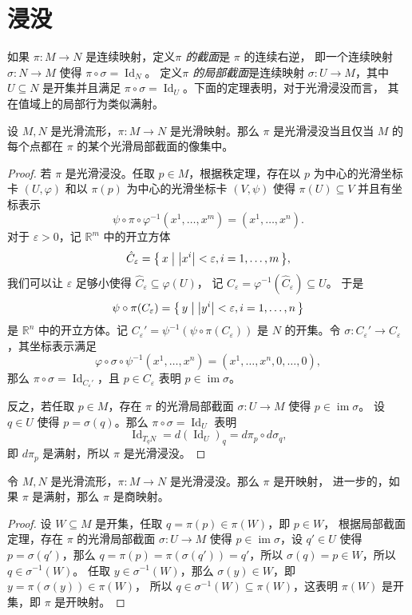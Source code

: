 \documentclass[fontset=none]{Notes}
\DeclareMathOperator\im{im}
\DeclareMathOperator\Id{Id}
\newcommand{\abs}[1]{\left|#1\right|}
\begin{document}
\section{浸没}

如果 $\pi:M\to N$ 是连续映射，定义\emph{$\pi$ 的截面}是 $\pi$ 的连续右逆，
即一个连续映射 $\sigma:N\to M$ 使得 $\pi\circ\sigma=\Id_N$。
定义\emph{$\pi$ 的局部截面}是连续映射 $\sigma:U\to M$，其中 $U\subseteq N$
是开集并且满足 $\pi\circ\sigma=\Id_U$。下面的定理表明，对于光滑浸没而言，
其在值域上的局部行为类似满射。

\begin{theorem}[局部截面定理]
  设 $M,N$ 是光滑流形，$\pi:M\to N$ 是光滑映射。那么 $\pi$ 是光滑浸没当且仅当
  $M$ 的每个点都在 $\pi$ 的某个光滑局部截面的像集中。
\end{theorem}
\begin{proof}
  若 $\pi$ 是光滑浸没。任取 $p\in M$，根据秩定理，存在以 $p$ 为中心的光滑坐标卡
  $(U,\varphi)$ 和以 $\pi(p)$ 为中心的光滑坐标卡 $(V,\psi)$ 使得
  $\pi(U)\subseteq V$ 并且有坐标表示
  \[
    \psi\circ\pi\circ\varphi^{-1}\left(x^1,\dots,x^m\right)=\left(x^1,\dots,x^n\right).
  \]
  对于 $\varepsilon>0$，记 $\mathbb{R}^m$ 中的开立方体
  \[
    \hat C_\varepsilon=\bigl\{\,x\bigm| \abs{x^i}<\varepsilon,i=1,\dots,m\,\bigr\},
  \]
  我们可以让 $\varepsilon$ 足够小使得 $\hat C_\varepsilon\subseteq \varphi(U)$，
  记 $C_\varepsilon=\varphi^{-1}\left(\hat C_\varepsilon\right)\subseteq U$。
  于是 
  \[ 
    \psi\circ\pi(C_\varepsilon)=\bigl\{\,y\bigm| \abs{y^i}<\varepsilon,i=1,\dots,n\,\bigr\}
  \]
  是 $\mathbb{R}^n$ 中的开立方体。记 $C_\varepsilon'=\psi^{-1}\left(\psi\circ \pi(C_\varepsilon)\right)$
  是 $N$ 的开集。令 $\sigma:C_\varepsilon'\to C_\varepsilon$，其坐标表示满足
  \[
    \varphi\circ\sigma\circ\psi^{-1}\left(x^1,\dots,x^n\right)  
    =\left(x^1,\dots,x^n,0,\dots,0\right),
  \]
  那么 $\pi\circ\sigma=\Id_{C_\varepsilon'}$，且 $p\in C_\varepsilon$ 表明
  $p\in\im\sigma$。

  反之，若任取 $p\in M$，存在 $\pi$ 的光滑局部截面 $\sigma:U\to M$ 使得 $p\in\im\sigma$。
  设 $q\in U$ 使得 $p=\sigma(q)$。那么 $\pi\circ\sigma=\Id_U$ 表明
  \[
    \Id_{T_qN}=d\left(\Id_U\right)_q= d\pi_{p}\circ d\sigma_q,
  \]
  即 $d\pi_p$ 是满射，所以 $\pi$ 是光滑浸没。
\end{proof}

\begin{proposition}[光滑浸没的性质]
  令 $M,N$ 是光滑流形，$\pi:M\to N$ 是光滑浸没。那么 $\pi$ 是开映射，
  进一步的，如果 $\pi$ 是满射，那么 $\pi$ 是商映射。
\end{proposition}
\begin{proof}
  设 $W\subseteq M$ 是开集，任取 $q=\pi(p)\in \pi(W)$，即 $p\in W$，
  根据局部截面定理，存在 $\pi$ 的光滑局部截面 $\sigma:U\to M$
  使得 $p\in \im\sigma$，设 $q'\in U$ 使得 $p=\sigma(q')$，那么
  $q=\pi(p)=\pi(\sigma(q'))=q'$，所以 $\sigma(q)=p\in W$，所以 $q\in \sigma^{-1}(W)$。
  任取 $y\in\sigma^{-1}(W)$，那么 $\sigma(y)\in W$，即 $y=\pi(\sigma(y))\in \pi(W)$，
  所以 $q\in\sigma^{-1}(W)\subseteq \pi(W)$，这表明 $\pi(W)$
  是开集，即 $\pi$ 是开映射。
\end{proof}
\end{document}
